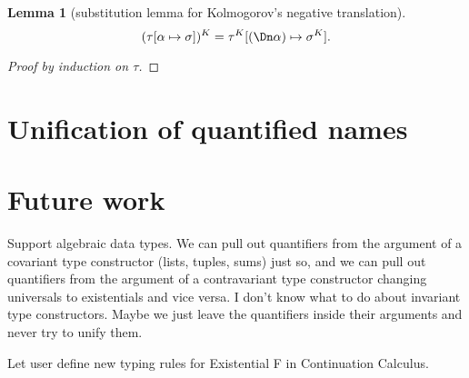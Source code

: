 \documentclass{amsart}
\newtheorem{lemma}[subsection]{Lemma}
\begin{document}
\begin{lemma}
[substitution lemma for Kolmogorov's negative translation]
\label{lem:subst-kolmogorov}
\[
(\tau[\alpha\mapsto\sigma])^K =
\tau^K[(\Dn\alpha) \mapsto \sigma^K].
\]
\end{lemma}

\begin{proof}
[Proof by induction on $\tau$]
\end{proof}

\section{Unification of quantified names}
\label{sec:unify}

\section{Future work}

Support algebraic data types. We can pull out quantifiers from
the argument of a covariant type constructor (lists, tuples,
sums) just so, and we can pull out quantifiers from the argument
of a contravariant type constructor changing universals to
existentials and vice versa. I don't know what to do about
invariant type constructors. Maybe we just leave the quantifiers
inside their arguments and never try to unify them.

Let user define new typing rules for Existential F in
Continuation Calculus.
\end{document}
